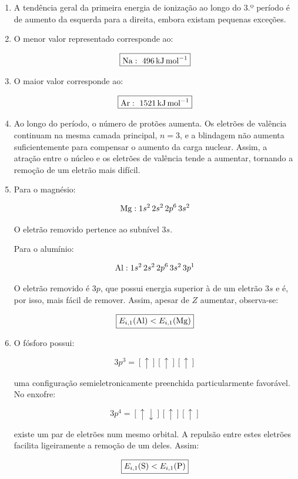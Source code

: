 \documentclass[11pt,a4paper]{article}
\newcounter{exercicio}
\newenvironment{resolucao}[1]
{
\refstepcounter{exercicio}
\begin{tcolorbox}[
    enhanced,
    breakable,
    colback=white,
    colframe=eublue,
    boxrule=0.8pt,
    arc=2mm,
    left=3mm,
    right=3mm,
    top=2mm,
    bottom=2mm,
    title={\textbf{Exercício \theexercicio}\hspace{1mm}--\hspace{1mm}#1},
    coltitle=white,
    colbacktitle=eublue,
    fonttitle=\bfseries
]
}
{
\end{tcolorbox}
}
\begin{document}
\begin{resolucao}{Interpretar uma propriedade periódica}

\begin{enumerate}[label=\alph*)]

\item A tendência geral da primeira energia de ionização ao longo do 3.º período é de aumento da esquerda para a direita, embora existam pequenas exceções.

\item O menor valor representado corresponde ao:

\[
\boxed{\ce{Na}:\ \SI{496}{\kilo\joule\per\mole}}
\]

\item O maior valor corresponde ao:

\[
\boxed{\ce{Ar}:\ \SI{1521}{\kilo\joule\per\mole}}
\]

\item Ao longo do período, o número de protões aumenta. Os eletrões de valência continuam na mesma camada principal, \(n=3\), e a blindagem não aumenta suficientemente para compensar o aumento da carga nuclear. Assim, a atração entre o núcleo e os eletrões de valência tende a aumentar, tornando a remoção de um eletrão mais difícil.

\item Para o magnésio:

\[
\ce{Mg}:1s^2\,2s^2\,2p^6\,3s^2
\]

O eletrão removido pertence ao subnível \(3s\).

Para o alumínio:

\[
\ce{Al}:1s^2\,2s^2\,2p^6\,3s^2\,3p^1
\]

O eletrão removido é \(3p\), que possui energia superior à de um eletrão \(3s\) e é, por isso, mais fácil de remover. Assim, apesar de \(Z\) aumentar, observa-se:

\[
\boxed{E_{i,1}(\ce{Al})<E_{i,1}(\ce{Mg})}
\]

\item O fósforo possui:

\[
3p^3=[\uparrow][\uparrow][\uparrow]
\]

uma configuração semieletronicamente preenchida particularmente favorável. No enxofre:

\[
3p^4=[\uparrow\downarrow][\uparrow][\uparrow]
\]

existe um par de eletrões num mesmo orbital. A repulsão entre estes eletrões facilita ligeiramente a remoção de um deles. Assim:

\[
\boxed{E_{i,1}(\ce{S})<E_{i,1}(\ce{P})}
\]

\end{enumerate}

\end{resolucao}
\end{document}
